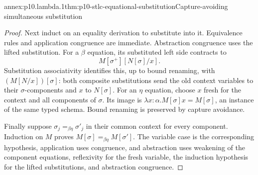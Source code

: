 \begin{annexitem}{annex:p10.lambda.1}{thm:p10-stlc-equational-substitution}{Capture-avoiding simultaneous substitution}
\begin{proof}
Next induct on an equality derivation to substitute into it.
Equivalence rules and application congruence are immediate.
Abstraction congruence uses the lifted substitution.
For a \(\beta\) equation, its substituted left side contracts
to
\[
                 M[\sigma^+][N[\sigma]/x].
\]
Substitution associativity identifies this, up to bound
renaming, with \((M[N/x])[\sigma]\): both composite
substitutions send the old context variables to their
\(\sigma\)-components and \(x\) to \(N[\sigma]\).
For an \(\eta\) equation, choose \(x\) fresh for the context
and all components of \(\sigma\).  Its image is
\(\lambda x{:}\alpha.M[\sigma]x=M[\sigma]\), an instance
of the same typed schema.  Bound renaming is preserved by
capture avoidance.

Finally suppose \(\sigma_j=_{\beta\eta}\sigma'_j\) in their
common context for every component.  Induction on \(M\)
proves \(M[\sigma]=_{\beta\eta}M[\sigma']\).
The variable case is the corresponding hypothesis,
application uses congruence, and abstraction uses weakening
of the component equations, reflexivity for the fresh variable,
the induction hypothesis for the lifted substitutions, and
abstraction congruence.
\end{proof}
\end{annexitem}

